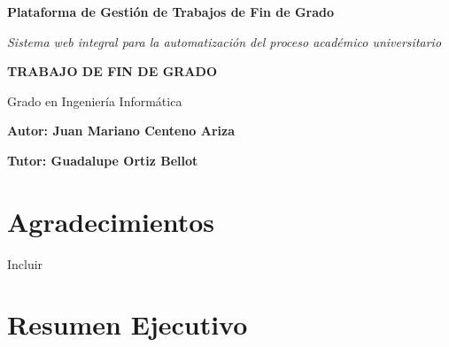 
\begin{titlepage}
\centering


{\huge\bfseries Plataforma de Gestión de Trabajos de Fin de Grado\par}
\vspace{0.5cm}
{\Large\itshape Sistema web integral para la automatización del proceso académico universitario\par}

\vspace{2cm}

{\Large\textbf{TRABAJO DE FIN DE GRADO}\par}
\vspace{0.5cm}
{\large Grado en Ingeniería Informática\par}

\vspace{2.5cm}

\begin{minipage}[t]{0.4\textwidth}
\begin{flushleft}
\large
\textbf{Autor: Juan Mariano Centeno Ariza}
\end{flushleft}
\end{minipage}
\hfill
\begin{minipage}[t]{0.4\textwidth}
\begin{flushright}
\large
\textbf{Tutor: Guadalupe Ortiz Bellot}
\end{flushright}
\end{minipage}

\vfill

\end{titlepage}

\newpage
\thispagestyle{plain}
\chapter*{Agradecimientos}

Incluir

\newpage
\thispagestyle{plain}
\chapter*{Resumen Ejecutivo}

